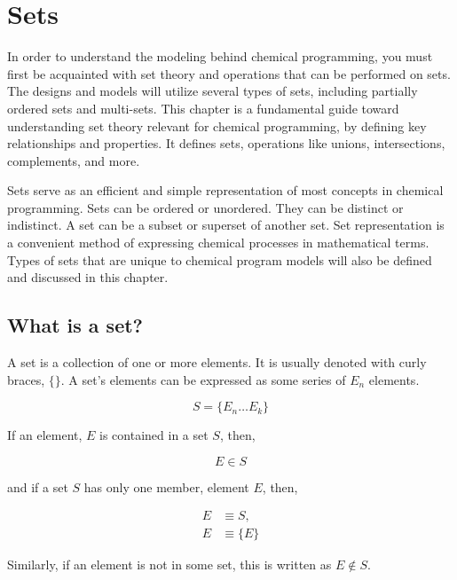
\chapter{Sets}

\par In order to understand the modeling behind chemical programming, you must first be acquainted with set theory and operations that can be performed on sets. The designs and models will utilize several types of sets, including partially ordered sets and multi-sets. This chapter is a fundamental guide toward understanding set theory relevant for chemical programming, by defining key relationships and properties. It defines sets, operations like unions, intersections, complements, and more. 

\par Sets serve as an efficient and simple representation of most concepts in chemical programming. Sets can be ordered or unordered. They can be distinct or indistinct. A set can be a subset or superset of another set. Set representation is a convenient method of expressing chemical processes in mathematical terms. Types of sets that are unique to chemical program models will also be defined and discussed in this chapter.

\section{What is a set?}

A set is a collection of one or more elements. It is usually denoted with curly braces, $\{\}$. A set's elements can be expressed as some series of $E_n$ elements.

$$
 S = \{E_n \dots E_k\}
$$

If an element, $E$ is contained in a set $S$, then,

$$
E \in S
$$

and if a set $S$ has only one member, element $E$, then,

\begin{align*}
E &\equiv S, \\
E &\equiv \{E\}
\end{align*}

Similarly, if an element is not in some set, this is written as $E \notin S$.